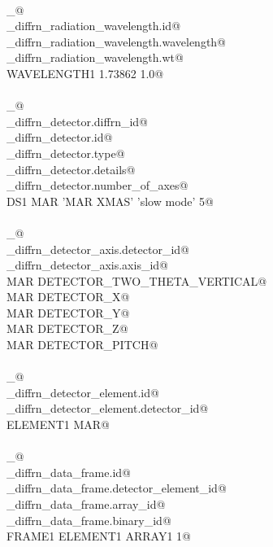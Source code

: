 \documentclass[10pt,a4paper,twoside,notitlepage]{article}
\begin{document}
\begin{flushleft}
\begin{list}{}{}
\mbox{}\verb@@\\
\mbox{}\verb@loop_@\\
\mbox{}\verb@_diffrn_radiation_wavelength.id@\\
\mbox{}\verb@_diffrn_radiation_wavelength.wavelength@\\
\mbox{}\verb@_diffrn_radiation_wavelength.wt@\\
\mbox{}\verb@ WAVELENGTH1 1.73862 1.0@\\
\mbox{}\verb@@\\
\mbox{}\verb@loop_@\\
\mbox{}\verb@_diffrn_detector.diffrn_id@\\
\mbox{}\verb@_diffrn_detector.id@\\
\mbox{}\verb@_diffrn_detector.type@\\
\mbox{}\verb@_diffrn_detector.details@\\
\mbox{}\verb@_diffrn_detector.number_of_axes@\\
\mbox{}\verb@ DS1 MAR 'MAR XMAS' 'slow mode' 5@\\
\mbox{}\verb@@\\
\mbox{}\verb@loop_@\\
\mbox{}\verb@_diffrn_detector_axis.detector_id@\\
\mbox{}\verb@_diffrn_detector_axis.axis_id@\\
\mbox{}\verb@ MAR DETECTOR_TWO_THETA_VERTICAL@\\
\mbox{}\verb@ MAR DETECTOR_X@\\
\mbox{}\verb@ MAR DETECTOR_Y@\\
\mbox{}\verb@ MAR DETECTOR_Z@\\
\mbox{}\verb@ MAR DETECTOR_PITCH@\\
\mbox{}\verb@@\\
\mbox{}\verb@loop_@\\
\mbox{}\verb@_diffrn_detector_element.id@\\
\mbox{}\verb@_diffrn_detector_element.detector_id@\\
\mbox{}\verb@ ELEMENT1 MAR@\\
\mbox{}\verb@@\\
\mbox{}\verb@loop_@\\
\mbox{}\verb@_diffrn_data_frame.id@\\
\mbox{}\verb@_diffrn_data_frame.detector_element_id@\\
\mbox{}\verb@_diffrn_data_frame.array_id@\\
\mbox{}\verb@_diffrn_data_frame.binary_id@\\
\mbox{}\verb@ FRAME1 ELEMENT1 ARRAY1 1@\\

\end{list}
\end{flushleft}
\end{document}
